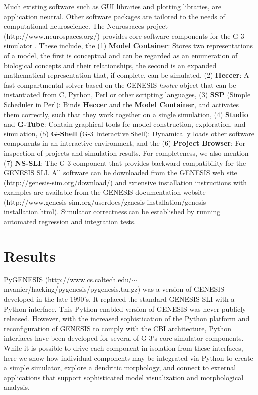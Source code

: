 \documentclass[10pt]{article}
\begin{document}
Much existing software such as GUI libraries and plotting libraries,
are application neutral.  Other software packages are tailored to the
needs of computational neuroscience.  The Neurospaces project
(http://www.neurospaces.org/) provides core software components for the
G-3 simulator \cite{cornelis03:_neuros}. These include, the (1) {\bf
  Model Container}: Stores two representations of a model, the first
is conceptual and can be regarded as an enumeration of biological
concepts and their relationships, the second is an expanded
mathematical representation that, if complete, can be simulated, (2)
{\bf Heccer}: A fast compartmental solver based on the GENESIS {\it
  hsolve} object that can be instantiated from C, Python, Perl or
other scripting languages, (3) {\bf SSP} (Simple Scheduler in Perl):
Binds {\bf Heccer} and the {\bf Model Container}, and activates them
correctly, such that they work together on a single simulation, (4)
{\bf Studio} and {\bf G-Tube}: Contain graphical tools for model
construction, exploration, and simulation, (5) {\bf G-Shell} (G-3
Interactive Shell): Dynamically loads other software components in an
interactive environment, and the (6) {\bf Project Browser}: For
inspection of projects and simulation results. For completeness, we
also mention (7) {\bf NS-SLI}: The G-3 component that provides
backward compatibility for the GENESIS SLI. All software can be
downloaded from the GENESIS web site
(http://genesis-sim.org/download/) and extensive installation
instructions with examples are available from the GENESIS
documentation website
(http://www.genesis-sim.org/userdocs/genesis-installation/genesis-installation.html).
Simulator correctness can be established by running automated
regression and integration tests.



\section*{\LARGE Results}

PyGENESIS
(http://www.cs.caltech.edu/$\sim$mvanier/hacking/pygenesis/pygenesis.tar.gz)
was a version of GENESIS developed in the late 1990's. It replaced the
standard GENESIS SLI with a Python interface. This Python-enabled
version of GENESIS was never publicly released.  However, with the
increased sophistication of the Python platform and reconfiguration of
GENESIS to comply with the CBI architecture, Python interfaces have
been developed for several of G-3's core simulator components.  While
it is possible to drive each component in isolation from these
interfaces, here we show how individual components may be integrated
via Python to create a simple simulator, explore a
dendritic morphology, and connect to external applications that
support sophisticated model visualization and morphological analysis.
\end{document}
